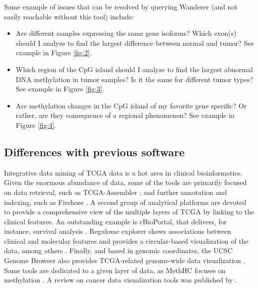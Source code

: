 \documentclass{bmcart}
\begin{document}
Some example of issues that can be resolved by querying Wanderer (and not easily reachable without this tool) include:
\begin{itemize}
\item Are different samples expressing the same gene isoforms? Which exon(s) should I analyze to find the largest difference between normal and tumor? See example in Figure \ref{fig:2}.
\item Which region of the CpG island should I analyze to find the largest abnormal DNA methylation in tumor samples? Is it the same for different tumor types? See example in Figure \ref{fig:3}.
\item Are methylation changes in the CpG island of my favorite gene specific? Or rather, are they consequence of a regional phenomenon? See example in Figure \ref{fig:4}.
\end{itemize}




\subsection*{Differences with previous software}

Integrative data mining of TCGA data is a hot area in clinical bioinformatics. Given the enormous abundance of data, some of the tools are primarily focused on data retrieval, such as TCGA-Assembler \cite{zhu2014tcga}; and further annotation and indexing, such as Firehose \cite{robbins2013self}. A second group of analytical platforms are devoted to provide a comprehensive view of the multiple layers of TCGA by linking to the clinical features. An outstanding example is cBioPortal, that delivers, for instance, survival analysis \cite{gao2013integrative}. Regulome explorer shows associations between clinical and molecular features and provides a circular-based visualization of the data, among others \cite{cancer2012comprehensive}. Finally, and based in genomic coordinates, the UCSC Genome Browser also provides TCGA-related genome-wide data visualization \cite{sanborn2010ucsc}. Some tools are dedicated to a given layer of data, as MethHC focuses on methylation \cite{huang2014methhc}. A review on cancer data visualization tools was published by \cite{schroeder2013visualizing}.\\
\end{document}

